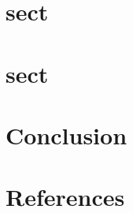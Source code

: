 \documentclass[final, paper=letter,5p,times,twocolumn]{elsarticle}
\begin{document}
\section{sect}

\section{sect}


\section{Conclusion}

\section*{References}



\end{document}
